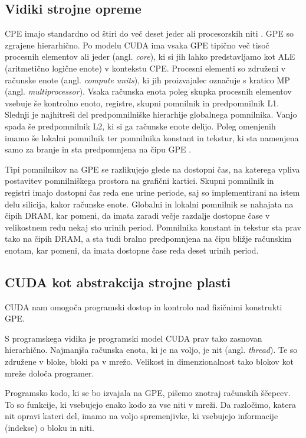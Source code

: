 \documentclass[a4paper, 12pt, openright]{book}
\begin{document}
\subsection{Vidiki strojne opreme}

CPE imajo standardno od štiri do več deset jeder ali procesorskih niti \cite{enwiki:1337149106}.
GPE so zgrajene hierarhično.
Po modelu CUDA ima vsaka GPE tipično več tisoč procesnih elementov ali jeder (angl. \textit{core}), ki si jih lahko predstavljamo kot ALE (aritmetično logične enote) v kontekstu CPE.
Procesni elementi so združeni v računske enote (angl. \textit{compute units}), ki jih proizvajalec označuje s kratico MP (angl. \textit{multiprocessor}).
Vsaka računska enota poleg skupka procesnih elementov vsebuje še kontrolno enoto, registre, skupni pomnilnik in predpomnilnik L1.
Slednji je najhitreši del predpomnilniške hierarhije globalnega pomnilnika. Vanjo spada še predpomnilnik L2, ki si ga računske enote delijo.
Poleg omenjenih imamo še lokalni pomnilnik ter pomnilnika konstant in tekstur, ki sta namenjena samo za branje in sta predpomnjena na čipu GPE \cite{oxford-slides, repo-ps, cuda-programming-guide, sling-workshop}.

Tipi pomnilnikov na GPE se razlikujejo glede na dostopni čas, na katerega vpliva postavitev pomnilniškega prostora na grafični kartici.
Skupni pomnilnik in registri imajo dostopni čas reda ene urine periode, saj so implementirani na istem delu silicija, kakor računske enote.
Globalni in lokalni pomnilnik se nahajata na čipih DRAM, kar pomeni, da imata zaradi večje razdalje dostopne čase v velikostnem redu nekaj sto urinih period.
Pomnilnika konstant in tekstur sta prav tako na čipih DRAM, a sta tudi bralno predpomnjena na čipu bližje računskim enotam, kar pomeni, da imata dostopne čase reda deset urinih period.

\subsection{CUDA kot abstrakcija strojne plasti}

CUDA nam omogoča programski dostop in kontrolo nad fizičnimi konstrukti GPE.

S programskega vidika je programski model CUDA prav tako zasnovan hierarhično. Najmanjša računska enota, ki je na voljo, je nit (angl. \textit{thread}).
Te so združene v bloke, bloki pa v mrežo. Velikost in dimenzionalnost tako blokov kot mreže določa programer.

Programsko kodo, ki se bo izvajala na GPE, pišemo znotraj računskih ščepcev.
To so funkcije, ki vsebujejo enako kodo za vse niti v mreži.
Da razločimo, katera nit opravi kateri del, imamo na voljo spremenjivke, ki vsebujejo informacije (indekse) o bloku in niti.
\end{document}
